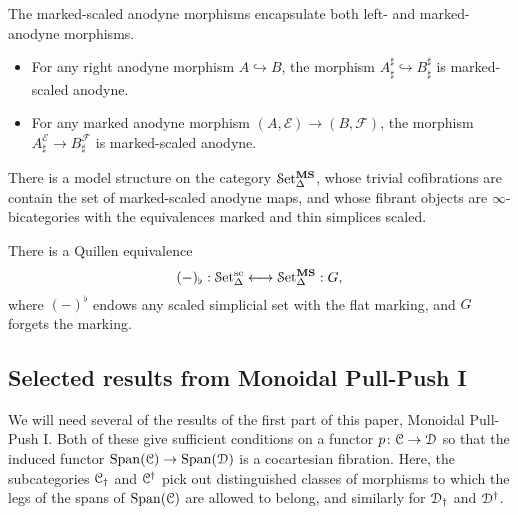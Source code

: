 \documentclass[main.tex]{subfiles}
\begin{document}
\begin{example}
  \label{prop:sharp_marked_right_anodyne}
  The marked-scaled anodyne morphisms encapsulate both left- and marked-anodyne morphisms.
  \begin{itemize}
    \item For any right anodyne morphism $A \hookrightarrow B$, the morphism $A^{\sharp}_{\sharp} \hookrightarrow B^{\sharp}_{\sharp}$ is marked-scaled anodyne.

    \item For any marked anodyne morphism $(A, \mathcal{E}) \to (B, \mathcal{F})$, the morphism $A^{\mathcal{E}}_{\sharp} \to B^{\mathcal{F}}_{\sharp}$ is marked-scaled anodyne.
  \end{itemize}
\end{example}

\begin{theorem}
  There is a model structure on the category $\mathcal{S}\mathrm{et}_{\Delta}^{\mathbf{MS}}$, whose trivial cofibrations are contain the set of marked-scaled anodyne maps, and whose fibrant objects are $\infty$-bicategories with the equivalences marked and thin simplices scaled.
\end{theorem}

\begin{theorem}
  \label{thm:quillen_equiv_ms_and_scaled}
  There is a Quillen equivalence
  \begin{equation*}
    (-)_{\flat} : \mathcal{S}\mathrm{et}_{\Delta}^{\mathrm{sc}} \longleftrightarrow \mathcal{S}\mathrm{et}_{\Delta}^{\mathbf{MS}} : G,
  \end{equation*}
  where $(-)^{\flat}$ endows any scaled simplicial set with the flat marking, and $G$ forgets the marking.
\end{theorem}

\subsection{Selected results from Monoidal Pull-Push I}
\label{ssc:selected_results_from_mppi}

We will need several of the results of the first part of this paper, Monoidal Pull-Push I. Both of these give sufficient conditions on a functor $p\colon \mathcal{C} \to \mathcal{D}$ so that the induced functor $\mathrm{Span}(\mathcal{C}) \to \mathrm{Span}(\mathcal{D})$ is a cocartesian fibration. Here, the subcategories $\mathcal{C}_{\dagger}$ and $\mathcal{C}^{\dagger}$ pick out distinguished classes of morphisms to which the legs of the spans of $\mathrm{Span}(\mathcal{C})$ are allowed to belong, and similarly for $\mathcal{D}_{\dagger}$ and $\mathcal{D}^{\dagger}$.
\end{document}
